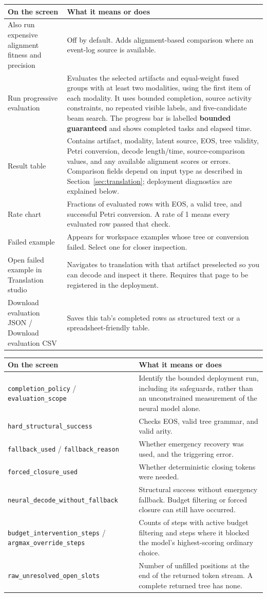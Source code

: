\documentclass[11pt,a4paper]{article}
\makeatletter
\newcommand{\ui}[1]{\textbf{#1}}
\newcommand{\code}[1]{\nolinkurl{#1}}
\newenvironment{controls}{%
  \small\begin{longtable}{@{}>{\raggedright\arraybackslash}p{.34\linewidth}
    >{\raggedright\arraybackslash}p{.62\linewidth}@{}}
  \toprule\textbf{On the screen} & \textbf{What it means or does}\\\midrule\endhead
  \bottomrule\endfoot
}{\end{longtable}\normalsize}
\makeatother
\begin{document}
\begin{controls}
Also run expensive alignment fitness and precision & Off by default.
Adds alignment-based comparison where an event-log source is available.\\
Run progressive evaluation & Evaluates the selected artifacts and equal-weight
fused groups with at least two modalities, using the first item of each
modality. It uses bounded completion, source activity constraints, no repeated
visible labels, and five-candidate beam search. The progress bar is labelled
\ui{bounded guaranteed} and shows completed tasks and elapsed time.\\
Result table & Contains artifact, modality, latent source, EOS, tree validity,
Petri conversion, decode length/time, source-comparison values, and any
available alignment scores or errors. Comparison fields depend on input type
as described in Section~\ref{sec:translation}; deployment diagnostics are
explained below.\\
Rate chart & Fractions of evaluated rows with EOS, a valid tree, and successful
Petri conversion. A rate of 1 means every evaluated row passed that check.\\
Failed example & Appears for workspace examples whose tree or conversion
failed. Select one for closer inspection.\\
Open failed example in Translation studio & Navigates to translation with
that artifact preselected so you can decode and inspect it there. Requires
that page to be registered in the deployment.\\
Download evaluation JSON / Download evaluation CSV & Saves this tab's
completed rows as structured text or a spreadsheet-friendly table.\\
\end{controls}

\begin{controls}
\code{completion_policy} / \code{evaluation_scope} & Identify the bounded
deployment run, including its safeguards, rather than an unconstrained
measurement of the neural model alone.\\
\code{hard_structural_success} & Checks EOS, valid tree grammar, and valid arity.\\
\code{fallback_used} / \code{fallback_reason} & Whether emergency recovery
was used, and the triggering error.\\
\code{forced_closure_used} & Whether deterministic closing tokens were needed.\\
\code{neural_decode_without_fallback} & Structural success without emergency
fallback. Budget filtering or forced closure can still have occurred.\\
\code{budget_intervention_steps} / \code{argmax_override_steps} & Counts of
steps with active budget filtering and steps where it blocked the model's
highest-scoring ordinary choice.\\
\code{raw_unresolved_open_slots} & Number of unfilled positions at the end of
the returned token stream. A complete returned tree has none.\\
\end{controls}
\end{document}
